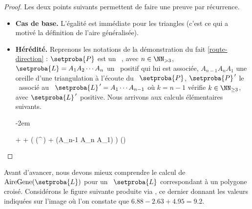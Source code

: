 \begin{proof}
    Les deux points suivants permettent de faire une preuve par récurrence.

    \begin{itemize}
		\item \textbf{Cas de base.}
		L'égalité est immédiate pour les triangles (c'est ce qui a motivé la définition de l'aire généralisée).


		\item \textbf{Hérédité.}
		Reprenons les notations de la démonstration du fait \ref{route-direction} : $\setproba{P}$ est un \ngone\ , avec $n \in \NN_{>3}$, $\setproba{L} = A_1 A_2 \cdots A_n$ un \ncycle\ positif qui lui est associée, $A_{n-1} A_n A_1$ une oreille d'une triangulation à l'écoute du \ngone\ $\setproba{P}$, $\setproba{P}^{\,\prime}$ le \kgone\ associé au \kcycle\ $\setproba{L}^{\,\prime} = A_1 \cdots A_{n-1}$ où $k = n-1$ vérifie $k \in \NN_{\geq3}$, avec $\setproba{L}^{\,\prime}$ positive. Nous arrivons aux calculs élémentaires suivants.
		
		\newpage
		
		\leavevmode\kern-2em%
		\begin{stepcalc}[style=ar*]
		          {}
		     + 
		          {}
		     + 
		          {}
		     \big( \mu(^{\,\prime}) + \mu(A_{n-1} A_n A_1) \big)
		          {}
		     \mu()
		          {}
		\end{stepcalc}
    \end{itemize}
\end{proof}





Avant d'avancer, nous devons mieux comprendre le calcul de $\garea{\setproba{L}}$ pour un \ncycle\ $\setproba{L}$ correspondant à un polygone croisé.
Considérons le figure suivante produite via \geogebra, ce dernier donnant les valeurs indiquées sur l'image où l'on constate que $\num{6.88} - \num{2.63} + \num{4.95} = \num{9.2}$.


